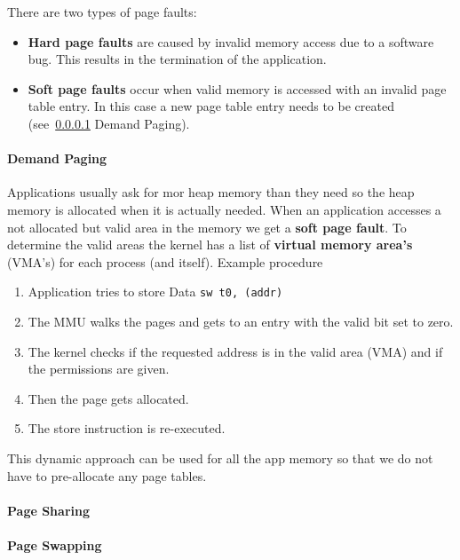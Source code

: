 There are two types of page faults:
\begin{itemize}
    \item \textbf{Hard page faults} are caused by invalid memory access due to a software bug. This results in the termination of the application.
    \item \textbf{Soft page faults} occur when valid memory is accessed with an invalid page table entry. In this case a new page table entry needs to be created (see~\ref{page demanding} Demand Paging).
\end{itemize}

\paragraph{Demand Paging}\label{page demanding}
Applications usually ask for mor heap memory than they need so the heap memory is allocated when it is actually needed.
When an application accesses a not allocated but valid area in the memory we get a \textbf{soft page fault}. To determine the valid areas the kernel has a list of \textbf{virtual memory area's} (VMA's) for each process (and itself).
\newpar{}
Example procedure
\begin{enumerate}
    \item Application tries to store Data
          \texttt{sw t0, (addr)}
    \item The MMU walks the pages and gets to an entry with the valid bit set to zero.
    \item The kernel checks if the requested address is in the valid area (VMA) and if the permissions are given.
    \item Then the page gets allocated.
    \item The store instruction is re-executed.
\end{enumerate}

\newpar{}

This dynamic approach can be used for all the app memory so that we do not have to pre-allocate any page tables.

\paragraph{Page Sharing}
\paragraph{Page Swapping}

